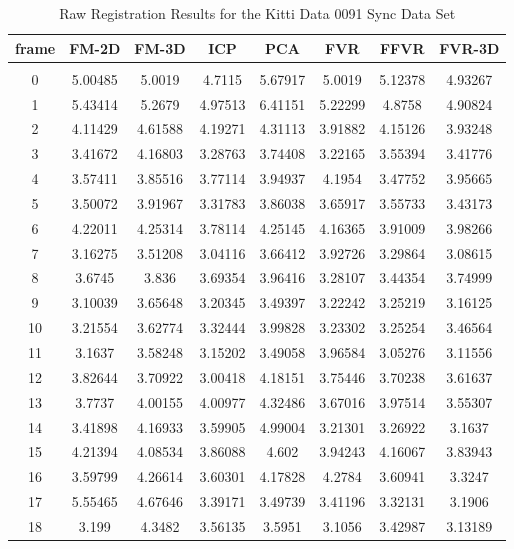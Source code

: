 \begin{center}
\begin{longtable}{cccccccc}
\caption{Raw Registration Results for the Kitti Data 0091 Sync Data Set}
\label{tab:kittidata0091syncFULL}
\endfirsthead
\endhead
\textbf{frame} & \textbf{FM-2D} & \textbf{FM-3D} & \textbf{ICP} & \textbf{PCA} & \textbf{FVR} & \textbf{FFVR} & \textbf{FVR-3D} \\
\hline \\
0 & 5.00485 & 5.0019 & 4.7115 & 5.67917 & 5.0019 & 5.12378 & 4.93267\\
1 & 5.43414 & 5.2679 & 4.97513 & 6.41151 & 5.22299 & 4.8758 & 4.90824\\
2 & 4.11429 & 4.61588 & 4.19271 & 4.31113 & 3.91882 & 4.15126 & 3.93248\\
3 & 3.41672 & 4.16803 & 3.28763 & 3.74408 & 3.22165 & 3.55394 & 3.41776\\
4 & 3.57411 & 3.85516 & 3.77114 & 3.94937 & 4.1954 & 3.47752 & 3.95665\\
5 & 3.50072 & 3.91967 & 3.31783 & 3.86038 & 3.65917 & 3.55733 & 3.43173\\
6 & 4.22011 & 4.25314 & 3.78114 & 4.25145 & 4.16365 & 3.91009 & 3.98266\\
7 & 3.16275 & 3.51208 & 3.04116 & 3.66412 & 3.92726 & 3.29864 & 3.08615\\
8 & 3.6745 & 3.836 & 3.69354 & 3.96416 & 3.28107 & 3.44354 & 3.74999\\
9 & 3.10039 & 3.65648 & 3.20345 & 3.49397 & 3.22242 & 3.25219 & 3.16125\\
10 & 3.21554 & 3.62774 & 3.32444 & 3.99828 & 3.23302 & 3.25254 & 3.46564\\
11 & 3.1637 & 3.58248 & 3.15202 & 3.49058 & 3.96584 & 3.05276 & 3.11556\\
12 & 3.82644 & 3.70922 & 3.00418 & 4.18151 & 3.75446 & 3.70238 & 3.61637\\
13 & 3.7737 & 4.00155 & 4.00977 & 4.32486 & 3.67016 & 3.97514 & 3.55307\\
14 & 3.41898 & 4.16933 & 3.59905 & 4.99004 & 3.21301 & 3.26922 & 3.1637\\
15 & 4.21394 & 4.08534 & 3.86088 & 4.602 & 3.94243 & 4.16067 & 3.83943\\
16 & 3.59799 & 4.26614 & 3.60301 & 4.17828 & 4.2784 & 3.60941 & 3.3247\\
17 & 5.55465 & 4.67646 & 3.39171 & 3.49739 & 3.41196 & 3.32131 & 3.1906\\
18 & 3.199 & 4.3482 & 3.56135 & 3.5951 & 3.1056 & 3.42987 & 3.13189\\

\end{longtable}
\end{center}
